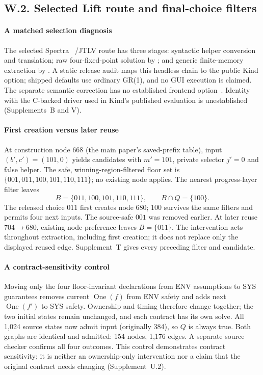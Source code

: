 \subsection*{W.2. Selected Lift route and final-choice filters}
\paragraph{A matched selection diagnosis}
The selected Spectra~\cite{spectrarelease2024} /JTLV
route has three stages: syntactic helper conversion and translation;
raw four-fixed-point solution by ; and generic
finite-memory extraction by .
A static release audit maps this headless chain to the public Kind
option; shipped defaults use ordinary GR(1), and no GUI execution
is claimed. The separate semantic correction has no established
frontend option~\cite{spectrarelease2024}. Identity with the C-backed
driver used in Kind's published evaluation is unestablished
(Supplements~B and V).

\paragraph{First creation versus later reuse}
At construction node 668 (the main paper's saved-prefix table), input
$(b',c')=(101,0)$ yields candidates with $m'=101$, private selector
$j'=0$ and false helper. The safe, winning-region-filtered floor set is
$\{001,011,100,101,110,111\}$; no existing node applies. The nearest
progress-layer filter leaves
\[
 B=\{011,100,101,110,111\},\qquad B\cap Q=\{100\}.
\]
The released choice $011$ first creates node 680; $100$ survives the
same filters and permits four next inputs. The source-safe $001$ was
removed earlier. At later reuse $704\to680$, existing-node preference
leaves $B=\{011\}$. The intervention acts throughout extraction,
including first creation; it does not replace only the displayed reused
edge. Supplement~T gives every preceding filter and candidate.

\paragraph{A contract-sensitivity control}
Moving only the four floor-invariant declarations from ENV assumptions
to SYS guarantees removes current $\operatorname{One}(f)$ from ENV safety
and adds next $\operatorname{One}(f')$ to SYS safety. Ownership and timing
therefore change together; the two initial states remain unchanged,
and each contract has its own solve. All 1,024 source states now admit
input (originally 384), so $Q$ is always true. Both graphs are identical
and admitted: 154 nodes, 1,176 edges. A separate source checker confirms
all four outcomes. This control demonstrates contract sensitivity;
it is neither an ownership-only intervention nor a claim that the
original contract needs changing (Supplement~U.2).
